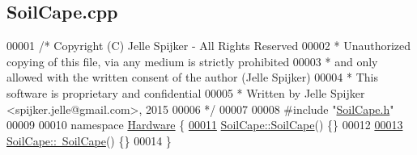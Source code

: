 \hypertarget{_soil_cape_8cpp_source}{}\subsection{Soil\+Cape.\+cpp}
\label{_soil_cape_8cpp_source}

\begin{DoxyCode}
00001 \textcolor{comment}{/* Copyright (C) Jelle Spijker - All Rights Reserved}
00002 \textcolor{comment}{ * Unauthorized copying of this file, via any medium is strictly prohibited}
00003 \textcolor{comment}{ * and only allowed with the written consent of the author (Jelle Spijker)}
00004 \textcolor{comment}{ * This software is proprietary and confidential}
00005 \textcolor{comment}{ * Written by Jelle Spijker <spijker.jelle@gmail.com>, 2015}
00006 \textcolor{comment}{ */}
00007 
00008 \textcolor{preprocessor}{#include "\hyperlink{_soil_cape_8h}{SoilCape.h}"}
00009 
00010 \textcolor{keyword}{namespace }\hyperlink{namespace_hardware}{Hardware} \{
\hypertarget{_soil_cape_8cpp_source_l00011}{}\hyperlink{class_hardware_1_1_soil_cape_acbe71c2b3132c35e3aa9fb619e193a10}{00011} \hyperlink{class_hardware_1_1_soil_cape_acbe71c2b3132c35e3aa9fb619e193a10}{SoilCape::SoilCape}() \{\}
00012 
\hypertarget{_soil_cape_8cpp_source_l00013}{}\hyperlink{class_hardware_1_1_soil_cape_acde8b92055d91a85b016623c7ccd5f5c}{00013} \hyperlink{class_hardware_1_1_soil_cape_acde8b92055d91a85b016623c7ccd5f5c}{SoilCape::~SoilCape}() \{\}
00014 \}
\end{DoxyCode}
